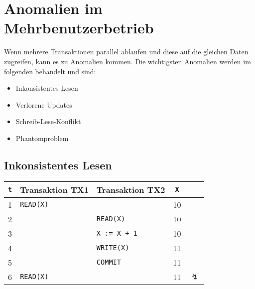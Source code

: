 \documentclass[a4paper, 11pt, accentcolor = tud3b]{tudreport}
\begin{document}
        \section{Anomalien im Mehrbenutzerbetrieb} %
        	Wenn mehrere Transaktionen parallel ablaufen und diese auf die gleichen Daten zugreifen, kann es zu Anomalien kommen. Die wichtigsten Anomalien werden im folgenden behandelt und sind:
        	\begin{itemize}
        		\item Inkonsistentes Lesen
        		\item Verlorene Updates
        		\item Schreib-Lese-Konflikt
        		\item Phantomproblem
        	\end{itemize}

            \subsection{Inkonsistentes Lesen} %
               	\begin{table}[H]
               		\centering
               		\begin{tabular}{c | l | l | c c}
               			\textbf{\texttt{t}} & \textbf{Transaktion TX1} & \textbf{Transaktion TX2} & \textbf{\texttt{X}} &                \\ \hline
               			         1          & \texttt{READ(X)}         &                          & 10                  &                \\
               			         2          &                          & \texttt{READ(X)}         & 10                  &                \\
               			         3          &                          & \texttt{X := X + 1}      & 10                  &                \\
               			         4          &                          & \texttt{WRITE(X)}        & 11                  &                \\
               			         5          &                          & \texttt{COMMIT}          & 11                  &                \\
               			         6          & \texttt{READ(X)}         &                          & 11                  & \(\lightning\)
               		\end{tabular}
               	\end{table}
            
\end{document}
